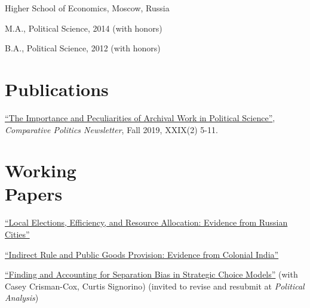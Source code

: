 \documentclass[margin,line,10.95pt]{res}
\newenvironment{list1}{
  \begin{list}{\ding{113}}{%
      \setlength{\itemsep}{0in}
      \setlength{\parsep}{0in} \setlength{\parskip}{0in}
      \setlength{\topsep}{0in} \setlength{\partopsep}{0in}
      \setlength{\leftmargin}{0.17in}}}{\end{list}}
\begin{document}
\begin{resume}
\vspace{-3mm}
{Higher School of Economics, Moscow, Russia}\\
\vspace*{-.1in}
\begin{list1}
 \item[] M.A., Political Science, 2014 (with honors) 
\item[] B.A., Political Science, 2012 (with honors)
\end{list1}



\section{\sc Publications}

\href{https://www.comparativepoliticsnewsletter.org/wp-content/uploads/2019/12/CP-Newsletter-Fall-19-CP-and-History.pdf}{``The Importance and Peculiarities of Archival Work in Political Science''}, \emph{Comparative Politics Newsletter}, Fall 2019, XXIX(2) 5-11.


\section{\sc Working \\ Papers}
\href{https://olgasparyan.com/documents/jmp_feb.pdf}{``Local Elections, Efficiency, and Resource Allocation: Evidence from Russian Cities''}

\vspace*{-2.5mm}

\href{https://papers.ssrn.com/sol3/papers.cfm?abstract_id=3689339}{``Indirect Rule and Public Goods Provision: Evidence from Colonial India''} 


\vspace*{-2.5mm}
\href{https://www.dropbox.com/s/eabsdevozqwpdzg/SeparationProject.pdf?dl=0}{``Finding and Accounting for Separation Bias in Strategic Choice Models''} (with Casey Crisman-Cox, Curtis Signorino) (invited to revise and resubmit at \textit{Political Analysis})


\end{resume}
\end{document}
